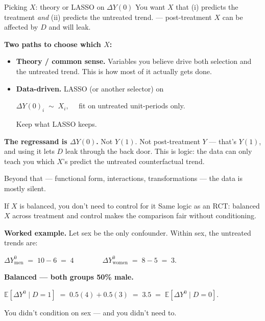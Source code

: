 \documentclass[aspectratio=169,11pt]{beamer}
\begin{document}
\begin{frame}{Picking $X$: theory or LASSO on $\Delta Y(0)$}
You want $X$ that (i) predicts the treatment \textit{and} (ii) predicts the untreated trend. \; --- post-treatment $X$ can be affected by $D$ and will leak.

\vspace{0.4em}
\textbf{Two paths to choose which $X$:}
\begin{itemize}\small
  \item \textbf{Theory / common sense.} \;Variables you believe drive both selection and the untreated trend. \;This is how most of it actually gets done.
  \item \textbf{Data-driven.} \;LASSO (or another selector) on
  \begin{center}\footnotesize
  $\Delta Y(0)_i \;\sim\; X_i, \quad$ fit on untreated unit-periods only.
  \end{center}
  Keep what LASSO keeps.
\end{itemize}

\vspace{0.4em}
\textbf{The regressand is \boldmath$\Delta Y(0)$.} \;Not $Y(1)$. Not post-treatment $Y$ --- that's $Y(1)$, and using it lets $D$ leak through the back door. This is  logic: the data can only teach you which $X$'s predict the untreated counterfactual trend.

\vspace{0.3em}
Beyond that --- functional form, interactions, transformations --- the data is mostly silent.
\end{frame}

\begin{frame}{If $X$ is balanced, you don't need to control for it}
\vspace{0.4em}
Same logic as an RCT: \;balanced $X$ across treatment and control makes the comparison fair without conditioning.

\vspace{0.7em}
\textbf{Worked example.} \;Let sex be the only confounder. Within sex, the untreated trends are:
\vspace{0.4em}
\begin{center}
$\Delta Y^0_{\text{men}} \;=\; 10 - 6 \;=\; 4 \qquad\qquad \Delta Y^0_{\text{women}} \;=\; 8 - 5 \;=\; 3.$
\end{center}

\vspace{0.7em}
\textbf{Balanced --- both groups 50\% male.}
\vspace{0.2em}
\begin{center}
$\mathbb{E}[\Delta Y^0 \mid D{=}1] \;=\; 0.5(4) + 0.5(3) \;=\; 3.5 \;=\; \mathbb{E}[\Delta Y^0 \mid D{=}0].$
\end{center}

\vspace{0.5em}
 \;You didn't condition on sex --- and you didn't need to.
\end{frame}
\end{document}
